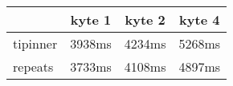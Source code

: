 \begin{tabular}{|l|c|c|c|}
\hline
 & kyte 1 & kyte 2 & kyte 4\\
\hline
tipinner &  3938ms &  4234ms &  5268ms\\
\hline
repeats &  3733ms &  4108ms &  4897ms\\
\hline
\end{tabular}

